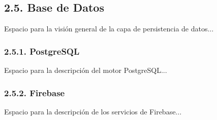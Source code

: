 \subsection{2.5. Base de Datos}\label{sec:base_datos}

Espacio para la visión general de la capa de persistencia de datos...

\subsubsection{2.5.1. PostgreSQL}\label{sec:postgresql}

Espacio para la descripción del motor PostgreSQL...

\subsubsection{2.5.2. Firebase}\label{sec:firebase}

Espacio para la descripción de los servicios de Firebase...

